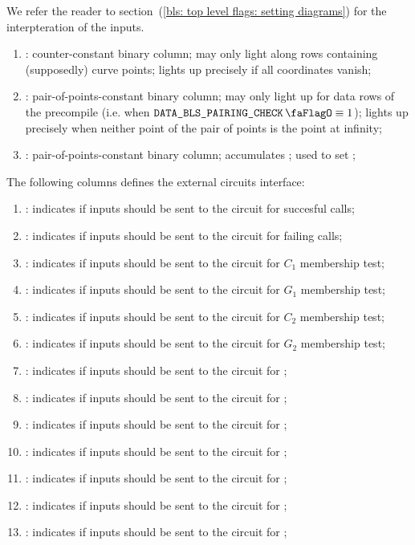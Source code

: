 We refer the reader to section~(\ref{bls: top level flags: setting diagrams}) for the interpteration of the inputs.
\begin{enumerate}[resume]
    \item
        \isInfinity:
        counter-constant binary column;
        may only light along rows containing (supposedly) curve points;
        lights up precisely if all coordinates vanish;
    \item
        \both{\nontrivialPairOfPointsBit}:
        pair-of-points-constant binary column;
        may only light up for data rows of the  precompile (i.e. when $\isBlsPairingCheckData \equiv 1$);
        lights up precisely when neither point of the pair of points is the point at infinity;
    \item
        \both{\nontrivialPairOfPointsAcc}:
        pair-of-points-constant binary column;
        accumulates \nontrivialPairOfPointsBit{};
        used to set \wellformedDataNontrivial{};
\end{enumerate}
The following columns defines the external circuits interface:
\begin{enumerate}[resume]
    \item
        \both{\csPointEvaluation}:
        indicates if inputs should be sent to the circuit for succesful  calls;
    \item
        \both{\csPointEvaluationFailure}:
        indicates if inputs should be sent to the circuit for failing  calls;
    \item
        \both{\csCOne}:
        indicates if inputs should be sent to the circuit for $C_1$ membership test;
    \item
        \both{\csGOne}:
        indicates if inputs should be sent to the circuit for $G_1$ membership test;
    \item
        \both{\csCTwo}:
        indicates if inputs should be sent to the circuit for $C_2$ membership test;
    \item
        \both{\csGTwo}:
        indicates if inputs should be sent to the circuit for $G_2$ membership test;
    \item
        \both{\csPairing}:
        indicates if inputs should be sent to the circuit for ;
    \item
        \both{\csGOneAdd}:
        indicates if inputs should be sent to the circuit for ;
    \item
        \both{\csGTwoAdd}:
        indicates if inputs should be sent to the circuit for ;
    \item
        \both{\csGOneMsm}:
        indicates if inputs should be sent to the circuit for ;
    \item
        \both{\csGTwoMsm}:
        indicates if inputs should be sent to the circuit for ;
    \item
        \both{\csMapFpToGOne}:
        indicates if inputs should be sent to the circuit for ;
    \item
        \both{\csMapFpTwoToGTwo}:
        indicates if inputs should be sent to the circuit for ;
\end{enumerate}

